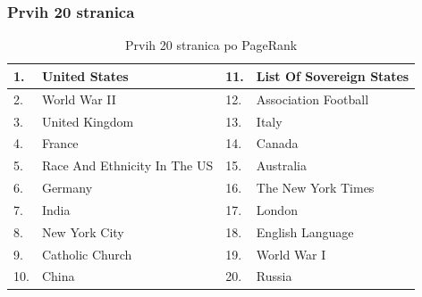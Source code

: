 \documentclass[11pt]{beamer}
\begin{document}
\begin{frame}
    \frametitle{Prvih 20 stranica}
  		\begin{center}
  		\begin{table}[]
\begin{tabular}{|l|l|l|l|}
\hline
1.  & United States                                  & 11. & List Of Sovereign States \\ \hline
2.  & World War II                                   & 12. & Association Football     \\ \hline
3.  & United Kingdom                                 & 13. & Italy                    \\ \hline
4.  & France                                         & 14. & Canada                   \\ \hline
5.  & Race And Ethnicity In The US & 15. & Australia                \\ \hline
6.  & Germany                                        & 16. & The New York Times       \\ \hline
7.  & India                                          & 17. & London                   \\ \hline
8.  & New York City                                  & 18. & English Language         \\ \hline
9.  & Catholic Church                                & 19. & World War I              \\ \hline
10. & China                                          & 20. & Russia                   \\ \hline
\end{tabular}
\caption{Prvih 20 stranica po PageRank}
\label{tabelatop20}
\end{table}
  		

        \end{center}
\end{frame}
\end{document}
